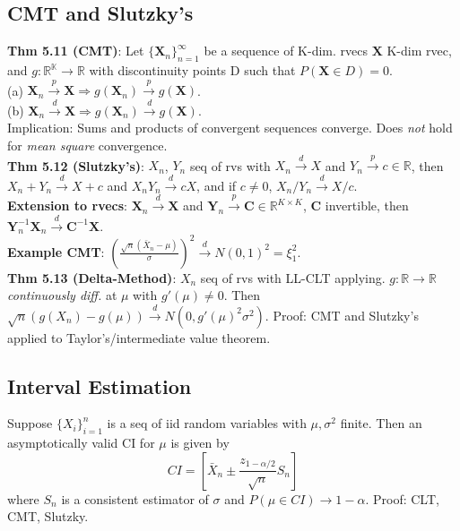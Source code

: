 \subsection{CMT and Slutzky's}
\textbf{Thm 5.11 (CMT)}: Let $\{\textbf{X}_n\}_{n=1}^\infty$ be a sequence of K-dim. rvecs $\textbf{X}$ K-dim rvec, and $g:\mathbb{R^K}\to\mathbb{R}$ with discontinuity points D such that $P(\textbf{X}\in D)=0$. \\
(a) $\textbf{X}_n \xrightarrow{p} \textbf{X} \Rightarrow g(\textbf{X}_n) \xrightarrow{p} g(\textbf{X})$.\\
(b) $\textbf{X}_n \xrightarrow{d} \textbf{X} \Rightarrow g(\textbf{X}_n) \xrightarrow{d} g(\textbf{X})$. \\
Implication: Sums and products of convergent sequences converge. Does \emph{not} hold for \emph{mean square} convergence.\\
\textbf{Thm 5.12 (Slutzky's)}: $X_n$, $Y_n$ seq of rvs with $X_n\xrightarrow{d} X$ and $Y_n\xrightarrow{p} c\in \mathbb{R}$, then $X_n + Y_n \xrightarrow{d} X + c$ and $X_nY_n\xrightarrow{d}cX$, and if $c\neq0$, $X_n/Y_n \xrightarrow{d} X/c$. \\
\textbf{Extension to rvecs}: $\textbf{X}_n \xrightarrow{d} \textbf{X}$ and $\textbf{Y}_n\xrightarrow{p}\textbf{C}\in\mathbb{R}^{K\times K}$, $\textbf{C}$ invertible, then $\textbf{Y}_n^{-1}\textbf{X}_n\xrightarrow{d}\textbf{C}^{-1}\textbf{X}$. \\
\textbf{Example CMT}: $\left(\frac{\sqrt{n}(\bar{X}_n - \mu)}{\sigma}\right)^2 \xrightarrow{d} N(0,1)^2 = \xi_1^2$.\\
\textbf{Thm 5.13 (Delta-Method)}: $X_n$ seq of rvs with LL-CLT applying. $g:\mathbb{R}\to\mathbb{R}$ \emph{continuously diff.} at $\mu$ with $g'(\mu)\neq0$. Then $\sqrt{n}(g(X_n)-g(\mu)) \xrightarrow{d} N(0, g'(\mu)^2\sigma^2)$. Proof: CMT and Slutzky's applied to Taylor's/intermediate value theorem. 

\subsection{Interval Estimation}
Suppose $\{X_i\}_{i=1}^n$ is a seq of iid random variables with $\mu, \sigma^2$ finite. Then an asymptotically valid CI for $\mu$ is given by 
\begin{equation*}
	CI = \left[\bar{X}_n \pm \frac{z_{1-\alpha/2}}{\sqrt{n}}S_n\right]
\end{equation*}
where $S_n$ is a consistent estimator of $\sigma$ and $P(\mu\in CI) \to 1-\alpha$. Proof: CLT, CMT, Slutzky. 


